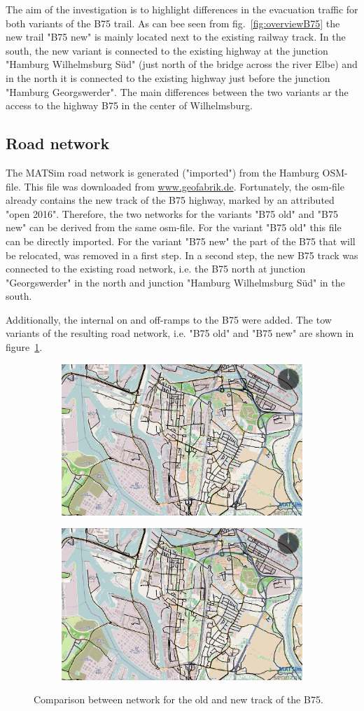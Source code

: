 The aim of the investigation is to highlight differences in the evacuation traffic for both variants of the B75 trail. As can bee seen from fig.~\ref{fig:overviewB75} the new trail "B75 new" is mainly located next to the existing railway track.
In the south, the new variant is connected to the existing highway at the junction "Hamburg Wilhelmsburg S\"ud" (just north of the bridge across the river Elbe) and in the north it is connected to the existing highway just before the junction "Hamburg Georgswerder". 
The main differences between the two variants ar the access to the highway B75 in the center of Wilhelmsburg.

\subsection{Road network}
The MATSim road network is generated ("imported") from the Hamburg OSM-file. This file was downloaded from \url{www.geofabrik.de}. Fortunately, the osm-file already contains the new track of the B75 highway, marked by an attributed "open 2016". Therefore, the two networks for the variants "B75 old" and "B75 new" can be derived from the same osm-file. For the variant "B75 old" this file can be directly imported. For the variant "B75 new" the part of the B75 that will be relocated, was removed in a first step. In a second step, the new B75 track was connected to the existing road network, i.e. the B75 north at junction "Georgswerder" in the north and junction "Hamburg Wilhelmsburg S\"ud" in the south.

Additionally, the internal on and off-ramps to the B75 were added. The tow variants of the resulting road network, i.e. "B75 old" and "B75 new" are shown in figure~\ref{fig:b75oldnew}.

\begin{figure}[!ht]
	\begin{subfigure}
		\centering
		\includegraphics[width=.475\linewidth]{extending/figures/Evacuation/b75old}
	\end{subfigure}\hfill
	\begin{subfigure}
		\centering
		\includegraphics[width=.475\linewidth]{extending/figures/Evacuation/b75new}
	\end{subfigure}
	\caption{Comparison between network for the old and new track of the B75.}
	\label{fig:b75oldnew}
\end{figure}

